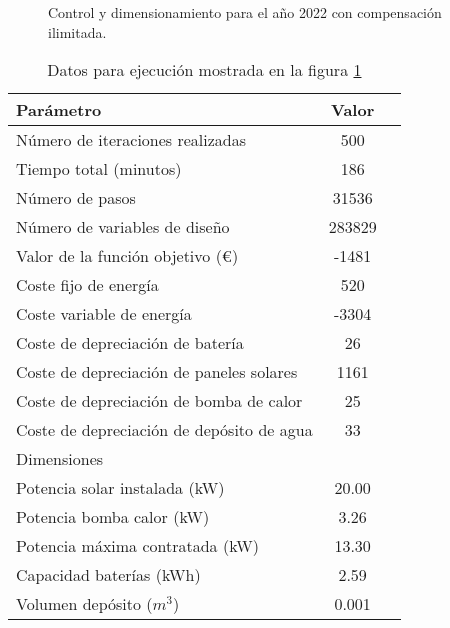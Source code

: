 \begin{figure}[h] \centering
	\centering
	
	\caption{Control y dimensionamiento para el año 2022 con compensación ilimitada.}
	\label{fig:sizing_offgrid_full_year}
\end{figure}

\begin{table}[ht]
	\centering
	\caption{Datos para ejecución mostrada en la figura \ref{fig:sizing_offgrid_full_year}}
	\label{tab:sizing_offgrid_full_year}
	\begin{tabular}{@{}lcc@{}}
		\toprule
		Parámetro                                 & Valor  \\
		\midrule
		Número de iteraciones realizadas          & 500    \\
		Tiempo total (minutos)                    & 186    \\
		Número de pasos                           & 31536  \\
		Número de variables de diseño             & 283829 \\
		\midrule
		Valor de la función objetivo (€)          & -1481  \\
		\midrule
		Coste fijo de energía                     & 520    \\
		Coste variable de energía                 & -3304  \\
		Coste de depreciación de batería          & 26     \\
		Coste de depreciación de paneles solares  & 1161   \\
		Coste de depreciación de bomba de calor   & 25     \\
		Coste de depreciación de depósito de agua & 33     \\
		\midrule
		Dimensiones                               &        \\
		\midrule
		Potencia solar instalada (kW)             & 20.00  \\
		Potencia bomba calor (kW)                 & 3.26   \\
		Potencia máxima contratada (kW)           & 13.30  \\
		Capacidad baterías (kWh)                  & 2.59   \\
		Volumen depósito ($m^3$)                  & 0.001  \\
		\bottomrule
	\end{tabular}
\end{table}
